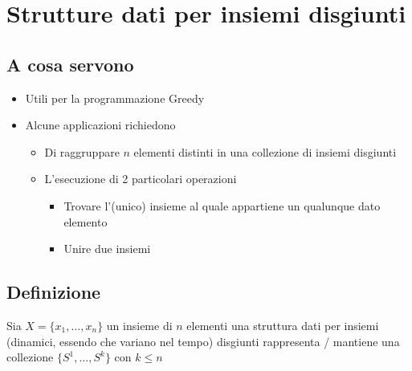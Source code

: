 \usetikzlibrary{fit, calc, positioning, arrows.meta}

\chapter{Strutture dati per insiemi disgiunti}

\section{A cosa servono}
\begin{itemize}
    \item Utili per la programmazione Greedy
    \item Alcune applicazioni richiedono
    \begin{itemize}
        \item Di raggruppare $n$ elementi distinti in una collezione di insiemi disgiunti
        \item L'esecuzione di 2 particolari operazioni
        \begin{itemize}
            \item Trovare l'(unico) insieme al quale appartiene un qualunque dato elemento
            \item Unire due insiemi
        \end{itemize}
    \end{itemize}
\end{itemize}

\section{Definizione}
Sia $X = \{x_1, \dots, x_n\}$ un insieme di $n$ elementi una struttura dati per insiemi (dinamici, essendo che variano nel tempo) disgiunti rappresenta / mantiene una collezione $\{S^1, \dots, S^k\} \text{ con $k \leq n$}$

